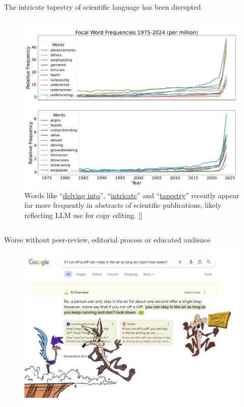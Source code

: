 \documentclass[10pt]{beamer}
\newcommand{\citeme}[1]{{\xspace\color{scAqua} \scriptsize [\cite{#1}]}}
\begin{document}
\begin{frame}{The intricate tapestry of scientific language has been disrupted}
\begin{columns}[T,onlytextwidth]
		\begin{figure}
			\includegraphics[width=1.17\textwidth]{figures/Juzek2024-Fig4.png}
			\caption{Words like “\href{https://pubmed.ncbi.nlm.nih.gov/?term=\%22delving\%20into\%22\&filter=years.2010-2024&timeline=expanded}{delving into}”, “\href{https://pubmed.ncbi.nlm.nih.gov/?term=\%22intricate\%22&filter=years.2010-2024&timeline=expanded}{intricate}” and “\href{https://pubmed.ncbi.nlm.nih.gov/?term=\%22tapestry\%22&filter=years.2010-2024&timeline=expanded}{tapestry}” recently appear far more frequently in abstracts of scientific publications, likely reflecting LLM use for copy editing.\citeme{Kobak2024,Juzek2024}}
		\end{figure}

	\end{columns}
\end{frame}

\begin{frame}{Worse without peer-review, editorial process or educated audience}
	\begin{figure}
		\hspace*{-1cm} 
		\includegraphics[height=0.97\textheight]{figures/Cliffs.png}
	\end{figure}
\end{frame}
\end{document}

